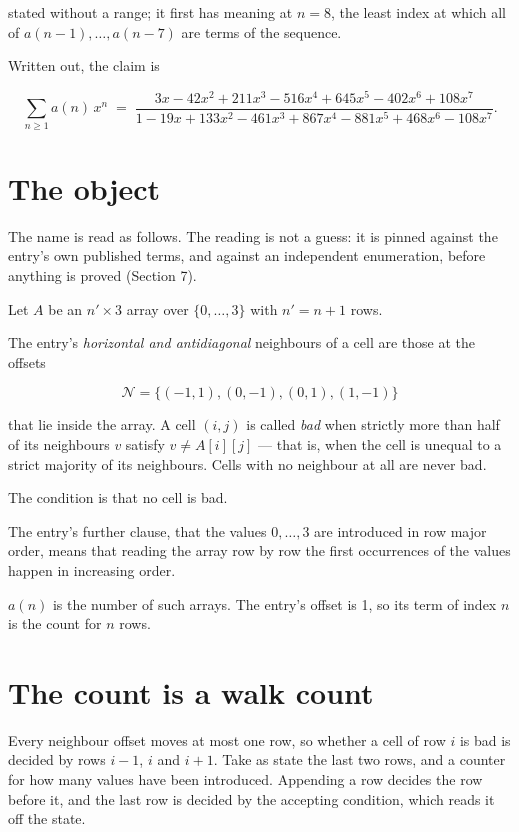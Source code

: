 \documentclass[11pt]{article}
\theoremstyle{definition}
\begin{document}
stated without a range; it first has meaning at $n = 8$, the least index at which all of $a(n-1),\dots,a(n-7)$ are terms of the sequence.

Written out, the claim is

\[\sum_{n \ge 1} a(n)\,x^n \;=\; \frac{3x - 42x^{2} + 211x^{3} - 516x^{4} + 645x^{5} - 402x^{6} + 108x^{7}}{1 - 19x + 133x^{2} - 461x^{3} + 867x^{4} - 881x^{5} + 468x^{6} - 108x^{7}}.\]

\section{The object}

The name is read as follows. The reading is not a guess: it is pinned against the entry's own published terms, and against an independent enumeration, before anything is proved (Section 7).

Let $A$ be an $n' \times 3$ array over $\{0,\dots,3\}$ with $n' = n + 1$ rows.

The entry's {\itshape horizontal and antidiagonal} neighbours of a cell are those at the offsets

\[\mathcal{N} = \{(-1,1), (0,-1), (0,1), (1,-1)\}\]

that lie inside the array. A cell $(i,j)$ is called {\itshape bad} when strictly more than half of its neighbours $v$ satisfy $v \ne A[i][j]$ --- that is, when the cell is unequal to a strict majority of its neighbours. Cells with no neighbour at all are never bad.

The condition is that no cell is bad.

The entry's further clause, that the values $0,\dots,3$ are introduced in row major order, means that reading the array row by row the first occurrences of the values happen in increasing order.

$a(n)$ is the number of such arrays. The entry's offset is 1, so its term of index $n$ is the count for $n$ rows.

\section{The count is a walk count}

Every neighbour offset moves at most one row, so whether a cell of row $i$ is bad is decided by rows $i-1$, $i$ and $i+1$. Take as state the last two rows, and a counter for how many values have been introduced. Appending a row decides the row before it, and the last row is decided by the accepting condition, which reads it off the state.
\end{document}
